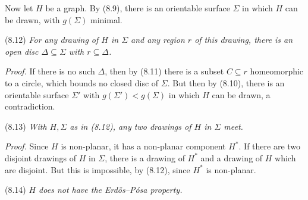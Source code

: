 Now let $H$ be a graph. By (8.9), there is an orientable surface $\Sigma$ in which $H$ can be drawn, with $g(\Sigma)$ minimal.

\stmt
(8.12) \textit{For any drawing of $H$ in $\Sigma$  and any region $r$ of this drawing, there is an open disc $\Delta \subseteq \Sigma$ with $r \subseteq \Delta$.}

\textit{Proof.} If there is no such $\Delta$, then by (8.11) there is a subset $C \subseteq r$ homeomorphic to a circle, which bounds no closed disc of $\Sigma$. But then by (8.10), there is an orientable surface $\Sigma'$ with $g(\Sigma') < g(\Sigma)$ in which $H$ can be drawn, a contradiction.

\stmt
(8.13) \textit{With $H, \Sigma$ as in (8.12), any two drawings of $H$ in $\Sigma$ meet.}

\textit{Proof.} Since $H$ is non-planar, it has a non-planar component $H^*$. If there are two disjoint drawings of $H$ in $\Sigma$, there is a drawing of $H^*$ and a drawing of $H$ which are disjoint. But this is impossible, by (8.12), since $H^*$ is non-planar.

\stmt
(8.14) \textit{$H$ does not have the Erd\"os--P\'osa property.}

